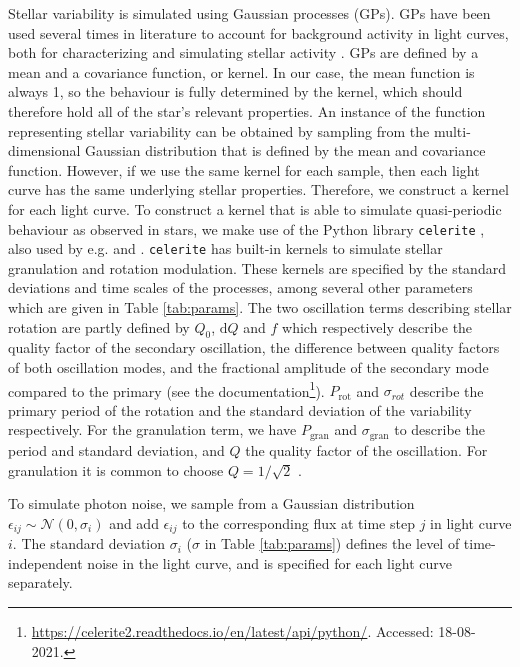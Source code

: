 Stellar variability is simulated using Gaussian processes (GPs). GPs have been used several times in literature to account for background activity in light curves, both for characterizing and simulating stellar activity \citep{barros2020improving, zucker2018shallow}. GPs are defined by a mean and a covariance function, or kernel. In our case, the mean function is always 1, so the behaviour is fully determined by the kernel, which should therefore hold all of the star's relevant properties. An instance of the function representing stellar variability can be obtained by sampling from the multi-dimensional Gaussian distribution that is defined by the mean and covariance function. However, if we use the same kernel for each sample, then each light curve has the same underlying stellar properties. Therefore, we construct a kernel for each light curve. To construct a kernel that is able to simulate quasi-periodic behaviour as observed in stars, we make use of the Python library \texttt{celerite} \citep{foreman2017fast}, also used by e.g. \cite{ment2020toi} and \cite{barros2020improving}.  \texttt{celerite} has built-in kernels to simulate stellar granulation and rotation modulation. These kernels are specified by the standard deviations and time scales of the processes, among several other parameters which are given in Table \ref{tab:params}. The two oscillation terms describing stellar rotation are partly defined by $Q_0$, $\text{d}Q$ and $f$ which respectively describe the quality factor of the secondary oscillation, the difference between quality factors of both oscillation modes, and the fractional amplitude of the secondary mode compared to the primary (see the documentation\footnote{\url{https://celerite2.readthedocs.io/en/latest/api/python/}. Accessed: 18-08-2021.}). $P_{\text{rot}}$ and $\sigma_{rot}$ describe the primary period of the rotation and the standard deviation of the variability respectively. For the granulation term, we have $P_\text{gran}$ and $\sigma_\text{gran}$ to describe the period and standard deviation, and $Q$ the quality factor of the oscillation. For granulation it is common to choose $Q=1/\sqrt{2}$ \citep{barros2020improving}.

To simulate photon noise, we sample from a Gaussian distribution $\epsilon_{ij} \sim \mathcal{N}(0, \sigma_i)$ and add $\epsilon_{ij}$ to the corresponding flux at time step $j$ in light curve $i$. The standard deviation $\sigma_i$ ($\sigma$ in Table \ref{tab:params}) defines the level of time-independent noise in the light curve, and is specified for each light curve separately. 

